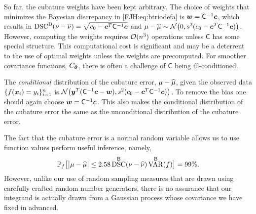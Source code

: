 \documentclass[graybox,footinfo]{svmult}
\DeclareMathOperator{\disc}{DSC}
\DeclareMathOperator{\Var}{VAR}
\begin{document}
So far, the cubature weights have been kept arbitrary.  The choice of weights that 
minimizes the Bayesian discrepancy in \eqref{FJH:eq:btriodefa} is ${\boldsymbol{w}} = 
\mathsf{C}^{-1} {\boldsymbol{c}}$, which results in $\disc^{\Ba}(\nu - \hnu) = \sqrt{c_0 - \bsc ^T 
\mC^{-1} \bsc}$ and $\mu - \widehat{\mu} \sim {\mathcal{N}} \bigl(0 , s^2(c_0 - {\boldsymbol{c}} ^T 
\mathsf{C}^{-1} {\boldsymbol{c}}) \bigr)$.  However, computing the weights requires ${\mathcal{O}}(n^3)$ 
operations 
unless $\mathsf{C}$ has some special structure.  This computational cost is significant 
and may be a deterrent to the use of optimal weights unless the weights are 
precomputed. For smoother covariance functions, $C_{\boldsymbol{\theta}}$, there is often a 
challenge of $\mathsf{C}$ being ill-conditioned.

The \emph{conditional} distribution of the cubature error, $\mu - \widehat{\mu}$, given the 
observed data $ \{f({\boldsymbol{x}}_i )= y_i\}_{i=1}^n$ is ${\mathcal{N}} \bigl( {\boldsymbol{y}}^T (\mathsf{C}^{-1}{\boldsymbol{c}} - 
{\boldsymbol{w}}) , s^2(c_0 - {\boldsymbol{c}} ^T \mathsf{C}^{-1} {\boldsymbol{c}}) \bigr)$.  To remove the bias one should again 
choose ${\boldsymbol{w}} = \mathsf{C}^{-1} {\boldsymbol{c}}$.  This also makes the conditional distribution of 
the cubature error the same as the unconditional distribution of the cubature error.

The fact that the cubature error is a normal random variable allows us to use function 
values perform useful inference, namely, 
\begin{equation} \label{FJH:eq:MLEBdOne}
\bbP_f\bigl[\abs{\mu - \hmu} \le 2.58 
\disc^{\Ba}(\nu - \hnu) \Var^{\Ba}(f)\bigr] = 99\%.
\end{equation}
However, unlike our use of random sampling measures that are drawn using carefully 
crafted random number generators, there is no assurance that our integrand is actually 
drawn from a Gaussian process whose covariance we have fixed in advanced.  
\end{document}
